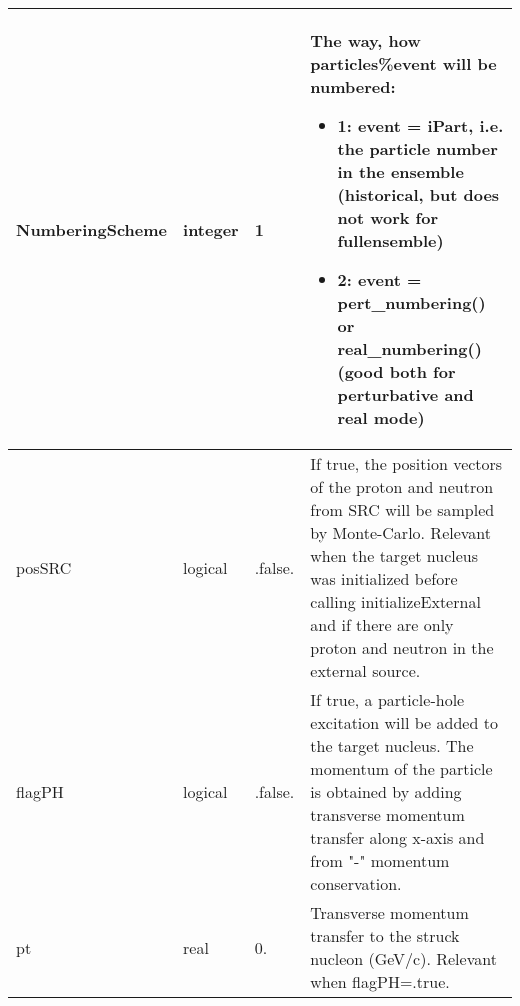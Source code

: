 \documentclass{article}
\begin{document}
\begin{longtable}{llll}
\midrule
NumberingScheme & \begin{minipage}[t]{2cm}integer\end{minipage} & \begin{minipage}[t]{2cm}1\end{minipage} & \begin{minipage}[t]{12cm}The way, how particles\%event will be numbered:\begin{itemize}\leftmargin0em\itemindent0pt\item 1: event = iPart, i.e. the particle number in the ensemble   (historical, but does not work for fullensemble)\item 2: event = pert\_numbering() or real\_numbering()   (good both for perturbative and real mode)\end{itemize}\end{minipage}\\*
\midrule
posSRC & \begin{minipage}[t]{2cm}logical\end{minipage} & \begin{minipage}[t]{2cm}.false.\end{minipage} & \begin{minipage}[t]{12cm}If true, the position vectors of the proton and neutron from SRC will be sampled by Monte-Carlo. Relevant when the target nucleus was initialized before calling initializeExternal and if there are only proton and neutron in the external source.\end{minipage}\\*
\midrule
flagPH & \begin{minipage}[t]{2cm}logical\end{minipage} & \begin{minipage}[t]{2cm}.false.\end{minipage} & \begin{minipage}[t]{12cm}If true, a particle-hole excitation will be added to the target nucleus. The momentum of the particle is obtained by adding transverse momentum transfer along x-axis and from "-" momentum conservation.\end{minipage}\\*
\midrule
pt & \begin{minipage}[t]{2cm}real\end{minipage} & \begin{minipage}[t]{2cm}0.\end{minipage} & \begin{minipage}[t]{12cm}Transverse momentum transfer to the struck nucleon (GeV/c). Relevant when flagPH=.true.\end{minipage}\\*
\bottomrule
\end{longtable}
{ }
\end{document}

